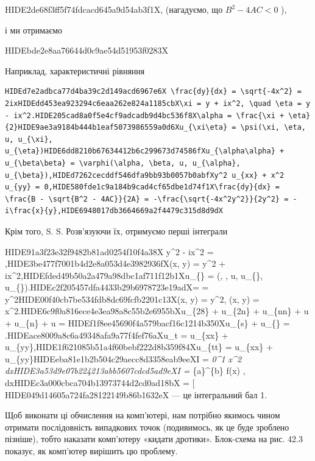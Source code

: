 \documentclass[
  ukrainian,
]{article}
\begin{document}
HIDE2de68f3ff5f74fdcacd645a9d54ab3f1X, (нагадуємо, що \(B^2 - 4AC < 0\)
),

і ми отримаємо

HIDEbde2e8aa76644d0c9ae54d51953f0283X

Наприклад, характеристичні рівняння

\begin{verbatim}
HIDEd7e2adbca77d4ba39c2d149acd6967e6X \frac{dy}{dx} = \sqrt{-4x^2} = 2ixHIDEdd453ea923294c6eaa262e824a1185cbX\xi = y + ix^2, \quad \eta = y - ix^2.HIDE205cad8a0f5e4cf9adcadb9d4bc536f8X\alpha = \frac{\xi + \eta}{2}HIDE9ae3a9184b444b1eaf5073986559a0d6Xu_{\xi\eta} = \psi(\xi, \eta, u, u_{\xi}, u_{\eta})HIDE6dd8210b67634412b6c299673d74586fXu_{\alpha\alpha} + u_{\beta\beta} = \varphi(\alpha, \beta, u, u_{\alpha}, u_{\beta}),HIDEd7262cecddf546dfa9bb93b0057b0abfXy^2 u_{xx} + x^2 u_{yy} = 0,HIDE580fde1c9a184b9cad4cf65dbe1d74f1X\frac{dy}{dx} = \frac{B - \sqrt{B^2 - 4AC}}{2A} = -\frac{\sqrt{-4x^2y^2}}{2y^2} = -i\frac{x}{y},HIDE6948017db3664669a2f4479c315d8d9dX
\end{verbatim}

Крім того, S. S. Розв'язуючи їх, отримуємо перші інтеграли

HIDE91a3f23e32f9482b81ad0254f10f4a38X y\^{}2 - ix\^{}2 =
,HIDE3be477f7001b4d2e8a053d4e3982936fX\xi(x, y) = y\^{}2 +
ix\^{}2,HIDEfded49b50a2a479a98dbc1af711f12b1Xu\_\{\xi\eta\} = \psi(\xi,
\eta, u, u\_\{\xi\},
u\_\{\eta\}).HIDEc2f205457dfa4433b29b6978723e19adX\alpha =
 = y\^{}2HIDE00f40cb7be534fdb8dc69fcfb2201c13X\xi(x,
y) = y\^{}2, \quad \eta(x, y) =
x\^{}2.HIDE6c9f0a816ece4e3ea98a8c55b2e6955bXu\_\{28\} +
u\_\{2n\} + u\_\{nn\} + u +
u\_\{n\} + u =
HIDEf1f8ee45690f4a579bacf16c1214b350Xu\_\{s\xi\} +
u\_\{\eta\eta\} =
.HIDEace8009a8c6a49348afa9a77f4fef76aXu\_t
= u\_\{xx\} + u\_\{yy\},HIDE1f621085b51a4f60bebf222d8b359f84Xu\_\{tt\} =
u\_\{xx\} + u\_\{yy\}HIDEeba81e1b2b504c29aecc8d3358eab9eeXI =
\int\emph{0\^{}1 x\^{}2 dxHIDE3a53d9e07b224213abb5607cdcd5ad9eXI =
\int}\{a\}\^{}\{b\} f(x) ,
dxHIDEc3a000cbca704b13973744d2cd0ad18bX = \Big[
HIDE049d14605a724fa28122149b86b1632eX — це інтегральний бал 1.

Щоб виконати ці обчислення на комп'ютері, нам потрібно якимось чином отримати послідовність випадкових точок (подивимось, як це буде зроблено пізніше), тобто наказати комп'ютеру «кидати дротики». Блок-схема на рис. 42.3 показує, як комп'ютер вирішить цю проблему.
\end{document}
